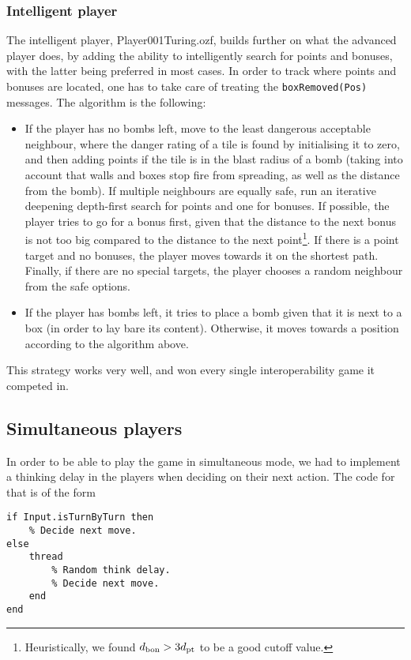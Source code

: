 \documentclass[12pt,journal]{IEEEtran}
\newcommand{\ntt}{\normalfont\ttfamily}
\newcommand{\fn}[1]{{\protect\ntt#1}}
\begin{document}
\subsubsection{Intelligent player}
The intelligent player, \fn{Player001Turing.ozf}, builds further on what the advanced player does, by adding the ability to intelligently search for points and bonuses, with the latter being preferred in most cases.
In order to track where points and bonuses are located, one has to take care of treating the \lstinline|boxRemoved(Pos)| messages.
The algorithm is the following:
\begin{itemize}
	\item If the player has no bombs left, move to the least dangerous acceptable neighbour, where the danger rating of a tile is found by initialising it to zero, and then adding points if the tile is in the blast radius of a bomb (taking into account that walls and boxes stop fire from spreading, as well as the distance from the bomb).
	If multiple neighbours are equally safe, run an iterative deepening depth-first search for points and one for bonuses.
	If possible, the player tries to go for a bonus first, given that the distance to the next bonus is not too big compared to the distance to the next point\footnote{Heuristically, we found \(d_{\textnormal{bon}} > 3d_{\textnormal{pt}}\) to be a good cutoff value.}.
	If there is a point target and no bonuses, the player moves towards it on the shortest path.
	Finally, if there are no special targets, the player chooses a random neighbour from the safe options.
	\item If the player has bombs left, it tries to place a bomb given that it is next to a box (in order to lay bare its content).
	Otherwise, it moves towards a position according to the algorithm above.
\end{itemize}

This strategy works very well, and won every single interoperability game it competed in.

\subsection{Simultaneous players}
In order to be able to play the game in simultaneous mode, we had to implement a thinking delay in the players when deciding on their next action.
The code for that is of the form
\begin{lstlisting}
if Input.isTurnByTurn then
	% Decide next move.
else
	thread
		% Random think delay.
		% Decide next move.
	end
end
\end{lstlisting}
\end{document}
